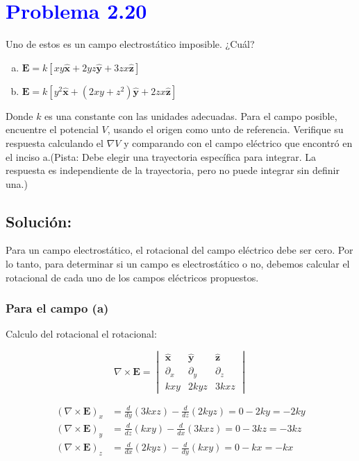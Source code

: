 \documentclass[12pt]{article}
\newcommand{\question}[1]{\textcolor{blue}{\textbf{#1}}}
\begin{document}

\section*{\question{ Problema 2.20}} Uno de estos es un campo electrostático imposible. ¿Cuál?

\begin{enumerate}[(a)]
    \item  \(\mathbf{E} = k[xy \mathbf{ \hat{x}}+ 2yz\mathbf{ \hat{y}}+ 3zx\mathbf{ \hat{z}}] \)
    \item \(\mathbf{E} = k[y^2\mathbf{ \hat{x}}+ (2xy + z^2)\mathbf{ \hat{y}}+ 2zx\mathbf{ \hat{z}}] \)
\end{enumerate}

Donde \(k\)  es una constante con las unidades adecuadas. Para el campo posible, encuentre el potencial \(V\), usando el origen como unto de referencia. Verifique su respuesta calculando el \(\nabla V\) y comparando con el campo eléctrico que encontró en el inciso a.(Pista: Debe elegir una trayectoria específica para integrar. La respuesta es independiente de la trayectoria, pero no puede integrar sin definir una.)

\subsection*{Solución:}
Para un campo electrostático, el rotacional del campo eléctrico debe ser cero. Por lo tanto, para determinar si un campo es electrostático o no, debemos calcular el rotacional de cada uno de los campos eléctricos propuestos.

\subsubsection*{Para el campo (a)}

Calculo del rotacional el rotacional:

\[
\nabla \times \mathbf{E} = 
\begin{vmatrix}
\hat{\mathbf{x}} & \hat{\mathbf{y}} & \hat{\mathbf{z}} \\
\partial_x & \partial_y & \partial_z \\
kxy & 2k yz & 3k xz
\end{vmatrix}
\]

\begin{align*}
(\nabla \times \mathbf{E})_x &= \frac{d}{dy} (3kxz) - \frac{d}{dz} (2kyz) = 0 - 2ky = -2ky \\
(\nabla \times \mathbf{E})_y &= \frac{d}{dz} (kxy) - \frac{d}{dx} (3kxz) = 0 - 3kz = -3kz \\
(\nabla \times \mathbf{E})_z &= \frac{d}{dx} (2kyz) - \frac{d}{dy} (kxy) = 0 - kx = -kx
\end{align*}
\end{document}
